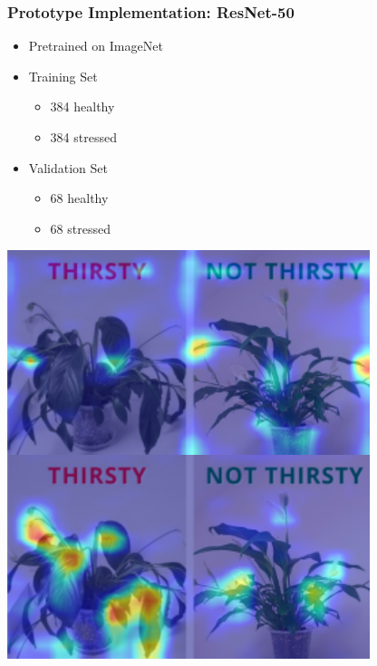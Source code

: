 \documentclass{beamer}
\begin{document}
\begin{frame}
  \frametitle{Prototype Implementation: ResNet-50}
  \begin{minipage}[bt]{.49\textwidth}
    \begin{itemize}
      \setlength{\itemsep}{1.1\baselineskip}
    \item Pretrained on ImageNet
    \item Training Set
      \begin{itemize}
      \item \num{384} healthy
      \item \num{384} stressed
      \end{itemize}
    \item Validation Set
      \begin{itemize}
      \item \num{68} healthy
      \item \num{68} stressed
      \end{itemize}
    \end{itemize}
  \end{minipage}
  \begin{minipage}[bt]{.49\textwidth}
    \begin{center}
      \includegraphics[width=\textwidth]{graphics/classifier-cam-cropped.pdf}
    \end{center}
  \end{minipage}
\end{frame}
\end{document}

